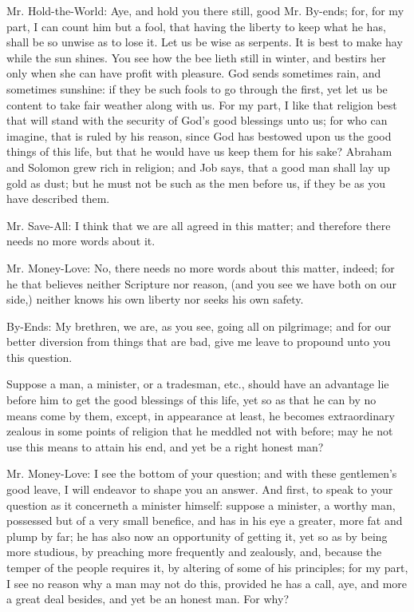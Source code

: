 Mr. Hold-the-World: Aye, and hold you there still, good Mr. By-ends; for, for my part, I can count him but a fool, that having the liberty to keep what he has, shall be so unwise as to lose it. Let us be wise as serpents. It is best to make hay while the sun shines. You see how the bee lieth still in winter, and bestirs her only when she can have profit with pleasure. God sends sometimes rain, and sometimes sunshine: if they be such fools to go through the first, yet let us be content to take fair weather along with us. For my part, I like that religion best that will stand with the security of God's good blessings unto us; for who can imagine, that is ruled by his reason, since God has bestowed upon us the good things of this life, but that he would have us keep them for his sake? Abraham and Solomon grew rich in religion; and Job says, that a good man shall lay up gold as dust; but he must not be such as the men before us, if they be as you have described them.

Mr. Save-All: I think that we are all agreed in this matter; and therefore there needs no more words about it.

Mr. Money-Love: No, there needs no more words about this matter, indeed; for he that believes neither Scripture nor reason, (and you see we have both on our side,) neither knows his own liberty nor seeks his own safety.

By-Ends: My brethren, we are, as you see, going all on pilgrimage; and for our better diversion from things that are bad, give me leave to propound unto you this question.

Suppose a man, a minister, or a tradesman, etc., should have an advantage lie before him to get the good blessings of this life, yet so as that he can by no means come by them, except, in appearance at least, he becomes extraordinary zealous in some points of religion that he meddled not with before; may he not use this means to attain his end, and yet be a right honest man?

Mr. Money-Love: I see the bottom of your question; and with these gentlemen's good leave, I will endeavor to shape you an answer. And first, to speak to your question as it concerneth a minister himself: suppose a minister, a worthy man, possessed but of a very small benefice, and has in his eye a greater, more fat and plump by far; he has also now an opportunity of getting it, yet so as by being more studious, by preaching more frequently and zealously, and, because the temper of the people requires it, by altering of some of his principles; for my part, I see no reason why a man may not do this, provided he has a call, aye, and more a great deal besides, and yet be an honest man. For why?

